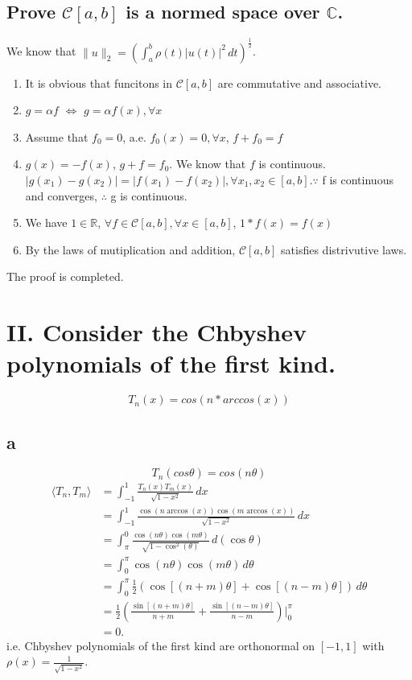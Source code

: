\documentclass[a4paper]{article}
\begin{document}
\subsection*{Prove $\mathcal{C} [a,b]$ is a normed space over $\mathbb{C}$.}
We know that $\parallel u \parallel_2 = (\int_{a}^{b} \rho(t)|u(t)|^2 \,dt )^{\frac{1}{2}}$.
\begin{enumerate}
  \item It is obvious that funcitons in $\mathcal{C}[a,b]$ are commutative and associative.
  \item $g = \alpha f$ $\Leftrightarrow$ $g = \alpha f(x), \forall x$
  \item Assume that $f_0 = 0$, a.e. $f_0(x) = 0 , \forall x$, $f + f_0 = f$ 
  \item $g(x) = - f(x)$, $g+f = f_0$. We know that $f$ is continuous. $|g(x_1)-g(x_2)| = |f(x_1)-f(x_2)|, \forall x_1,x_2 \in [a,b]$.$\because$ f is continuous and converges, $\therefore$ g is continuous.
  \item We have $1 \in  \mathbb{R} $, $\forall f \in  \mathcal{C} [a,b], \forall x \in [a,b]$, $1*f(x) = f(x)$
  \item By the laws of mutiplication and addition, $\mathcal{C}[a,b]$ satisfies distrivutive laws.
\end{enumerate}
The proof is completed.

\section*{II. Consider the Chbyshev polynomials of the first kind.}
$$T_n(x) = cos(n *arccos(x))$$
\subsection*{a}
$$T_n(cos \theta) = cos(n \theta)$$
\begin{align*}
  \langle T_n, T_m \rangle & = 
  \int_{-1}^1 \frac{T_n(x)T_m(x)}{\sqrt{1-x^2}}\, dx \\
  & = \int_{-1}^1 \frac{\cos(n\arccos(x)) \cos(m\arccos(x))}{\sqrt{1-x^2}}\, dx \\
  & = \int_{\pi}^0 \frac{\cos(n \theta) \cos(m \theta)}{\sqrt{1-\cos^2(\theta)}} \, d(\cos \theta) \\
  & = \int_0^{\pi} \cos(n\theta) \cos(m\theta) \, d\theta \\
  & = \int_0^{\pi} \frac{1}{2}(\cos[(n+m)\theta] + \cos[(n-m)\theta]) \, d\theta \\
  & = \frac{1}{2}(\frac{\sin[(n+m)\theta]}{n+m} + \frac{\sin[(n-m)\theta]}{n-m}) |_0^{\pi} \\
  & = 0.
\end{align*}
i.e. Chbyshev polynomials of the first kind are orthonormal on $[-1,1]$ with $\rho(x)=\frac{1}{\sqrt{1-x^2}}.$
\end{document}
